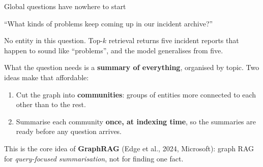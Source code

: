 \documentclass[aspectratio=169]{beamer}
\newcommand{\quotebox}[1]{%
  \begin{center}
  \begin{tcolorbox}[colback=lightbg, colframe=gray, boxrule=0.5pt, arc=2pt, width=0.88\textwidth]
    \small #1
  \end{tcolorbox}
  \end{center}}
\begin{document}
\begin{frame}{Global questions have nowhere to start}
  \vspace{0.2em}
  \quotebox{``What kinds of problems keep coming up in our incident archive?''}

  \vspace{0.2em}
  No entity in this question. Top-$k$ retrieval returns five incident reports that happen to
  sound like ``problems'', and the model generalises from five.

  \vspace{0.3em}
  What the question needs is a \textbf{summary of everything}, organised by topic. Two ideas
  make that affordable:

  \vspace{0.2em}
  \begin{enumerate}
    \item Cut the graph into \textbf{communities}: groups of entities more connected to each
      other than to the rest.
    \item Summarise each community \textbf{once, at indexing time}, so the summaries are ready
      before any question arrives.
  \end{enumerate}

  \vspace{0.2em}
  {\small This is the core idea of \textbf{GraphRAG} (Edge et al., 2024, Microsoft): graph RAG
  for \emph{query-focused summarisation}, not for finding one fact.}
\end{frame}
\end{document}
